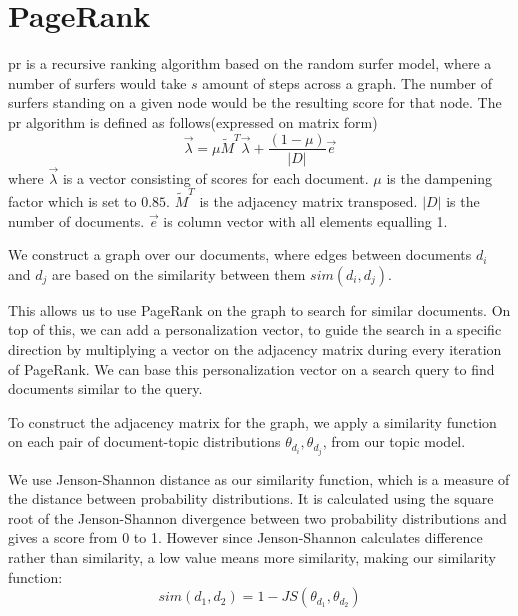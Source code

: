 \section{PageRank}\label{sec:pagerank}
\gls{pr} is a recursive ranking algorithm based on the random surfer model, where a number of surfers would take $s$ amount of steps across a graph. 
The number of surfers standing on a given node would be the resulting score for that node.
The \gls{pr} algorithm is defined as follows(expressed on matrix form)
$$ \overrightarrow{\lambda} = \mu \widetilde{M}^T \overrightarrow{\lambda} + \frac{(1-\mu)}{|D|} \overrightarrow{e} $$  
where $\overrightarrow{\lambda}$ is a vector consisting of scores for each document. 
$\mu$ is the dampening factor which is set to $0.85$.
$\widetilde{M}^T$ is the adjacency matrix transposed.
$|D|$ is the number of documents.
$\overrightarrow{e}$ is column vector with all elements equalling 1.

We construct a graph over our documents, where edges between documents $d_i$ and $d_j$ are based on the similarity between them $sim(d_i, d_j)$.

This allows us to use PageRank on the graph to search for similar documents.
On top of this, we can add a personalization vector, to guide the search in a specific direction by multiplying a vector on the adjacency matrix during every iteration of PageRank.
We can base this personalization vector on a search query to find documents similar to the query.

To construct the adjacency matrix for the graph, we apply a similarity function on each pair of document-topic distributions $\theta_{d_i}, \theta_{d_j}$, from our topic model.

We use Jenson-Shannon distance as our similarity function, which is a measure of the distance between probability distributions\cite{jensen-shannon2003}\cite{jensen-shannondis2003}.
It is calculated using the square root of the Jenson-Shannon divergence between two probability distributions and gives a score from 0 to 1.
However since Jenson-Shannon calculates difference rather than similarity, a low value means more similarity, making our similarity function:
$$sim(d_1, d_2) = 1 - JS(\theta_{d_1}, \theta_{d_2})$$



